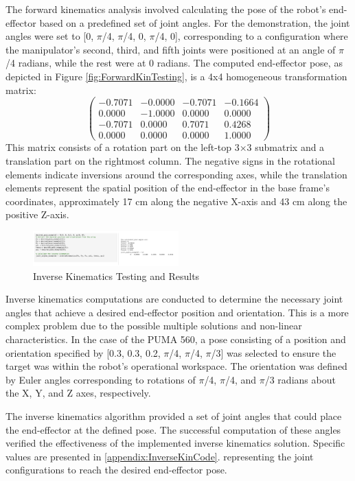 \documentclass[conference]{IEEEtran}
\begin{document}
The forward kinematics analysis involved calculating the pose of the robot's end-effector based on a predefined set of joint angles. For the demonstration, the joint angles were set to [0, $\pi$/4, $\pi$/4, 0, $\pi$/4, 0], corresponding to a configuration where the manipulator's second, third, and fifth joints were positioned at an angle of $\pi$/4 radians, while the rest were at 0 radians. The computed end-effector pose, as depicted in Figure \ref{fig:ForwardKinTesting}, is a 4x4 homogeneous transformation matrix:
\[
\begin{pmatrix}
-0.7071 & -0.0000 & -0.7071 & -0.1664 \\
0.0000 & -1.0000 & 0.0000 & 0.0000 \\
-0.7071 & 0.0000 & 0.7071 & 0.4268 \\
0.0000 & 0.0000 & 0.0000 & 1.0000
\end{pmatrix}
\]
This matrix consists of a rotation part on the left-top  3×3 submatrix and a translation part on the rightmost column. The negative signs in the rotational elements indicate inversions around the corresponding axes, while the translation elements represent the spatial position of the end-effector in the base frame's coordinates, approximately 17 cm along the negative X-axis and 43 cm along the positive Z-axis.

\begin{figure}[H]
    \centering
    \includegraphics[width=0.5\textwidth]{inverseKinTesting.png}
    \caption{Inverse Kinematics Testing and Results}
    \label{fig:InverseKinTesting}
\end{figure}
Inverse kinematics computations are conducted to determine the necessary joint angles that achieve a desired end-effector position and orientation. This is a more complex problem due to the possible multiple solutions and non-linear characteristics. In the case of the PUMA 560, a pose consisting of a position and orientation specified by [0.3, 0.3, 0.2, $\pi$/4, $\pi$/4, $\pi$/3] was selected to ensure the target was within the robot's operational workspace. The orientation was defined by Euler angles corresponding to rotations of $\pi$/4, $\pi$/4, and $\pi$/3 radians about the X, Y, and Z axes, respectively.

The inverse kinematics algorithm provided a set of joint angles that could place the end-effector at the defined pose. The successful computation of these angles verified the effectiveness of the implemented inverse kinematics solution. Specific values are presented in \ref{appendix:InverseKinCode}. representing the joint configurations to reach the desired end-effector pose.
\end{document}

